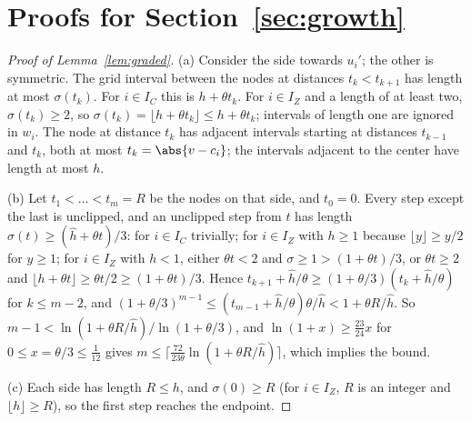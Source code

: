 \section{Proofs for Section~\ref{sec:growth}}\label{app:growth}

\begin{proof}[Proof of Lemma~\ref{lem:graded}]
(a) Consider the side towards $u_i'$; the other is symmetric. The grid interval
between the nodes at distances $t_k<t_{k+1}$ has length at most $\sigma(t_k)$.
For $i\in I_C$ this is $h+\theta t_k$. For $i\in I_Z$ and a length of at least
two, $\sigma(t_k)\ge2$, so $\sigma(t_k)=\lfloor h+\theta t_k\rfloor\le h+\theta t_k$;
intervals of length one are ignored in $w_i$. The node at distance $t_k$ has
adjacent intervals starting at distances $t_{k-1}$ and $t_k$, both at most
$t_k=\abs{v-c_i}$; the intervals adjacent to the center have length at most $h$.

(b) Let $t_1<\dots<t_m=R$ be the nodes on that side, and $t_0=0$. Every step
except the last is unclipped, and an unclipped step from $t$ has length
$\sigma(t)\ge(\hat h+\theta t)/3$: for $i\in I_C$ trivially; for $i\in I_Z$
with $h\ge1$ because $\lfloor y\rfloor\ge y/2$ for $y\ge1$; for $i\in I_Z$ with
$h<1$, either $\theta t<2$ and $\sigma\ge1>(1+\theta t)/3$, or $\theta t\ge2$
and $\lfloor h+\theta t\rfloor\ge\theta t/2\ge(1+\theta t)/3$. Hence
$t_{k+1}+\hat h/\theta\ge(1+\theta/3)(t_k+\hat h/\theta)$ for $k\le m-2$, and
$(1+\theta/3)^{m-1}\le(t_{m-1}+\hat h/\theta)\theta/\hat h<1+\theta R/\hat h$.
So $m-1<\ln(1+\theta R/\hat h)/\ln(1+\theta/3)$, and
$\ln(1+x)\ge\frac{23}{24}x$ for $0\le x=\theta/3\le\frac1{12}$ gives
$m\le\lceil\frac{72}{23\theta}\ln(1+\theta R/\hat h)\rceil$, which implies the
bound.

(c) Each side has length $R\le h$, and $\sigma(0)\ge R$ (for $i\in I_Z$, $R$ is
an integer and $\lfloor h\rfloor\ge R$), so the first step reaches the endpoint.
\end{proof}

